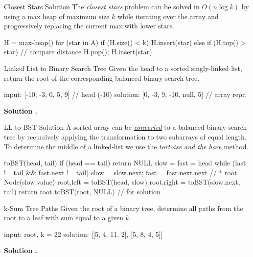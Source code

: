\documentclass{cognito}
\begin{document}
\begin{note}{Closest Stars Solution}
	The \hyperref[note:Closest Stars Problem]{\it closest stars} problem can be solved
	in $O(n \log k)$ by using a max heap of maximum size $k$ while iterating over the
	array  and progressively replacing the current max with lower stars.
	
	\begin{largecode}
 H = max-heap()
 for (star in A)
 	if (H.size() < k) H.insert(star)
	else if (H.top() > star)  // compare distance
		H.pop(); H.insert(star)
	\end{largecode}
	\vspace{-5pt}
\end{note}

\begin{note}{Linked List to Binary Search Tree}
	Given the head to a sorted singly-linked list, return the root of
	the corresponding balanced binary search tree.
	
	\begin{largecode}
 input: [-10, -3, 0, 5, 9]           // head (-10)
 solution: [0, -3, 9, -10, null, 5]  // array repr.
	\end{largecode}
	\bf Solution \hyperref[note:LL to BST Solution]{\solutionref}.
\end{note}

\begin{note}{LL to BST Solution}
	A sorted array can be \hyperref[note:Linked List to Binary Search Tree]{\it converted} to a balanced
	binary search tree by recursively applying the transformation to two subarrays of equal length.
	To determine the middle of a linked-list we use the {\it tortoise and the hare} method.
	
	\begin{largecode}
 toBST(head, tail)
 	if (head == tail) return NULL
	slow = fast = head
	while (fast != tail && fast.next != tail)
		slow = slow.next; fast = fast.next.next  // *
	root = Node(slow.value)
	root.left = toBST(head, slow)
	root.right = toBST(slow.next, tail)
	return root
 toBST(root, NULL)  // for solution
	\end{largecode}
	\vspace{-5pt}
\end{note}

\begin{note}{k-Sum Tree Paths}
	Given the root of a binary tree, determine all paths from the root to a leaf with
	sum equal to a given $k$.
	
	\begin{largecode}
 input: root, k = 22
 solution: [[5, 4, 11, 2], [5, 8, 4, 5]]
	\end{largecode}
	\bf Solution \hyperref[note:k-Sum Tree Paths Solution]{\solutionref}.
\end{note}
\end{document}
